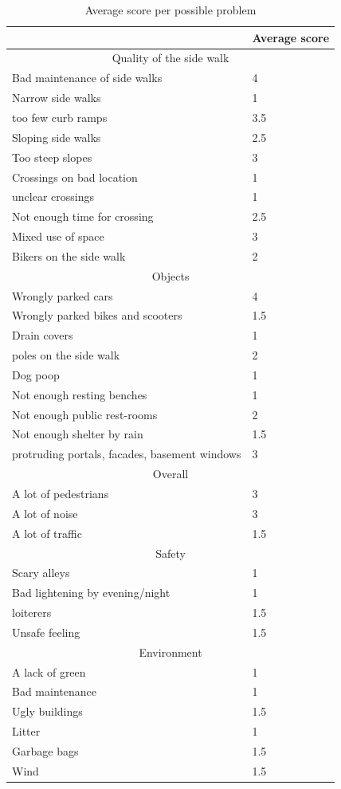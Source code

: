 \begin{appendix}
\begin{table}[H]
\caption{Average score per possible problem \label{obstacles}}
\begin{tabular}{|p{195pt}|p{195pt}|}
	\hline
	 & Average score \\
	\hline
	\multicolumn{2}{|c|}{Quality of the side walk} \\
	\hline
	Bad maintenance of side walks & 4 \\
	Narrow side walks & 1 \\
	too few curb ramps & 3.5 \\
	Sloping side walks & 2.5  \\
	Too steep slopes & 3 \\
	Crossings on bad location & 1 \\
	unclear crossings & 1 \\
	Not enough time for crossing & 2.5 \\
	Mixed use of space & 3 \\
	Bikers on the side walk & 2 \\
	\hline
	\multicolumn{2}{|c|}{Objects} \\
	\hline
	Wrongly parked cars & 4 \\
	Wrongly parked bikes and scooters & 1.5 \\
	Drain covers & 1 \\
	poles on the side walk & 2 \\
	Dog poop & 1 \\
	Not enough resting benches & 1 \\
	Not enough public rest-rooms & 2 \\
	Not enough shelter by rain & 1.5 \\
	protruding portals, facades, basement windows & 3 \\
	\hline
	\multicolumn{2}{|c|}{Overall} \\
	\hline   
	A lot of pedestrians & 3 \\
	A lot of noise & 3 \\
	A lot of traffic & 1.5 \\
	\hline
	\multicolumn{2}{|c|}{Safety} \\
	\hline
	Scary alleys & 1 \\
	Bad lightening by evening/night & 1 \\
	loiterers & 1.5 \\
	Unsafe feeling & 1.5 \\
	\hline
	\multicolumn{2}{|c|}{Environment} \\
	\hline 
	A lack of green & 1 \\
	Bad maintenance & 1 \\
	Ugly buildings & 1.5 \\
	Litter & 1 \\
	Garbage bags & 1.5 \\
	Wind & 1.5 \\
	\hline
\end{tabular}
\end{table}


\end{appendix}
